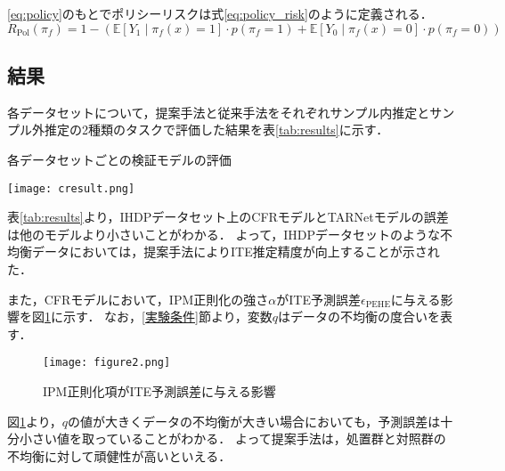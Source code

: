\documentclass[dvipdfmx]{jreport}
\begin{document}
\eqref{eq:policy}のもとでポリシーリスクは式\eqref{eq:policy_risk}のように定義される．
\begin{equation}
    R_{\text{Pol}}(\pi_f) = 1 - \left( \mathbb{E}[Y_1 \mid \pi_f(x) = 1] \cdot p(\pi_f = 1)
    + \mathbb{E}[Y_0 \mid \pi_f(x) = 0] \cdot p(\pi_f = 0) \right) \label{eq:policy_risk}
\end{equation}

\subsection{結果}
各データセットについて，提案手法と従来手法をそれぞれサンプル内推定とサンプル外推定の2種類のタスクで評価した結果を表\ref{tab:results}に示す．
\begin{table}[h]
    \caption{各データセットごとの検証モデルの評価} \label{tab:results}
    \begin{center}
        \texttt{[image: cresult.png]}
    \end{center}
\end{table}

表\ref{tab:results}より，IHDPデータセット上のCFRモデルとTARNetモデルの誤差は他のモデルより小さいことがわかる．
よって，IHDPデータセットのような不均衡データにおいては，提案手法によりITE推定精度が向上することが示された．

また，CFRモデルにおいて，IPM正則化の強さ$\alpha$がITE予測誤差$\epsilon_{\mathrm{PEHE}}$に与える影響を図\ref{fig:cfr}に示す．
なお，\ref{実験条件}節より，変数$q$はデータの不均衡の度合いを表す．
\begin{figure}[h]
    \begin{center}
        \texttt{[image: figure2.png]}
    \end{center}
    \caption{IPM正則化項がITE予測誤差に与える影響} \label{fig:cfr}
\end{figure}
図\ref{fig:cfr}より，$q$の値が大きくデータの不均衡が大きい場合においても，予測誤差は十分小さい値を取っていることがわかる．
よって提案手法は，処置群と対照群の不均衡に対して頑健性が高いといえる．
\end{document}
